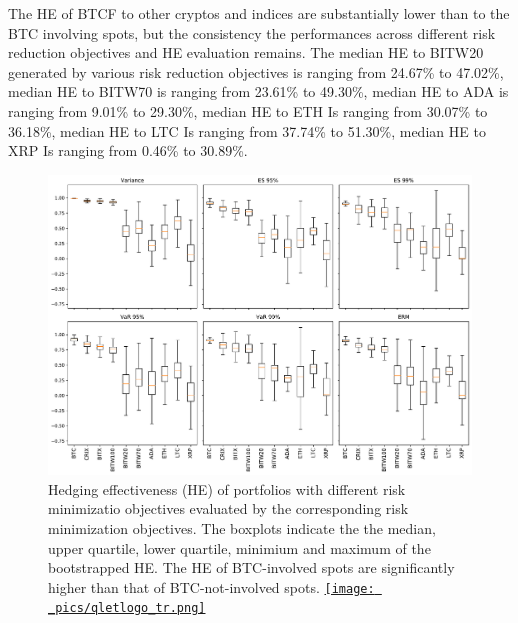 The HE of BTCF to other cryptos and indices are substantially lower than to the BTC involving spots, but the consistency the performances across different risk reduction objectives and HE evaluation remains.
The median HE to BITW20 generated by various risk reduction objectives is ranging from 24.67\% to 47.02\%, median HE to BITW70 is ranging from 23.61\% to 49.30\%,
median HE to ADA is ranging from 9.01\% to 29.30\%, median HE to ETH Is ranging from 30.07\% to 36.18\%, median HE to LTC Is ranging from 37.74\% to 51.30\%,
median HE to XRP Is ranging from 0.46\% to 30.89\%.
\begin{figure}[h]
\includegraphics[width=\textwidth]{_pics/ES5_HE_boxplot.pdf}
  \caption{Hedging effectiveness (HE) of portfolios with different risk minimizatio objectives evaluated by the corresponding risk minimization objectives.
            The boxplots indicate the the median, upper quartile, lower quartile, minimium and maximum of the bootstrapped HE.
            The HE of BTC-involved spots are significantly higher than that of BTC-not-involved spots.
  \href{http://www.quantlet.com/}{\texttt{[image: \_pics/qletlogo\_tr.png]}} }
\label{fig:HEboxplot}
\end{figure}


